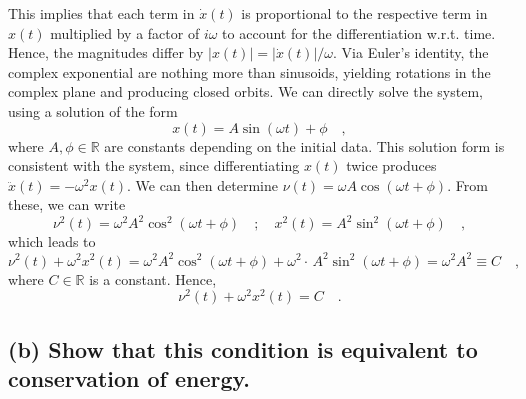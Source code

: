 \documentclass[draft]{agujournal2019}
\begin{document}
This implies that each term in $\dot x(t)$ is proportional to the respective term in $x(t)$ multiplied by a factor of $i\omega$ to account for the differentiation w.r.t. time. Hence, the magnitudes differ by $|x(t)| = |\dot x(t)| / \omega$. Via Euler's identity, the complex exponential are nothing more than sinusoids, yielding rotations in the complex plane and producing closed orbits. We can directly solve the system, using a solution of the form 
\begin{equation*}
    x(t) = A \sin{(\omega t)+\phi} \quad ,
\end{equation*}
where $A,\phi\in\mathbb{R}$ are constants depending on the initial data.
This solution form is consistent with the system, since differentiating $x(t)$ twice produces $\ddot x(t) = -\omega^2 x(t)$. We can then determine $\nu(t) = \omega A \cos{(\omega t + \phi)}$. From these, we can write
\begin{equation*}
    \nu^2(t) = \omega^2 A^2 \cos^2{(\omega t + \phi)} \quad ; \quad x^2(t) = A^2\sin^2{(\omega t + \phi)} \quad ,
\end{equation*}
which leads to 
\begin{equation*}
    \nu^2(t) + \omega^2 x^2(t) = \omega^2 A^2 \cos^2{(\omega t + \phi)} + \omega^2 \cdot\, A^2\sin^2{(\omega t + \phi)} = \omega^2 A^2 \equiv C\quad ,
\end{equation*}
where $C\in\mathbb{R}$ is a constant. Hence, 
\begin{equation*}
    \nu^2(t) + \omega^2 x^2(t) = C\quad .
\end{equation*}



\subsection{(b) Show that this condition is equivalent to conservation of energy.}
\label{ssec:p1b}


\end{document}
